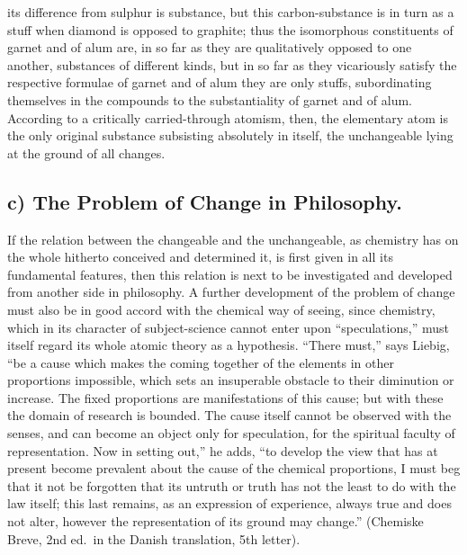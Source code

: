 \documentclass[12pt,a4paper]{book}
\begin{document}
its difference from
sulphur is substance, but this carbon-substance is in turn as a stuff when
diamond is opposed to graphite; thus the isomorphous constituents of garnet and
of alum are, in so far as they are qualitatively opposed to one another,
substances of different kinds, but in so far as they vicariously satisfy the
respective formulae of garnet and of alum they are only stuffs, subordinating
themselves in the compounds to the substantiality of garnet and of alum.
According to a critically carried-through atomism, then, the elementary atom is
the only original substance subsisting absolutely in itself, the unchangeable
lying at the ground of all changes.

\subsection*{c) The Problem of Change in Philosophy.}

If the relation between the changeable and the unchangeable, as chemistry has
on the whole hitherto conceived and determined it, is first given in all its
fundamental features, then this relation is next to be investigated and
developed from another side in philosophy. A further development of the problem
of change must also be in good accord with the chemical way of seeing, since
chemistry, which in its character of subject-science cannot enter upon
``speculations,'' must itself regard its whole atomic theory as a hypothesis.
``There must,'' says Liebig, ``be a cause which makes the coming together of
the elements in other proportions impossible, which sets an insuperable
obstacle to their diminution or increase. The fixed proportions are
manifestations of this cause; but with these the domain of research is bounded.
The cause itself cannot be observed with the senses, and can become an object
only for speculation, for the spiritual faculty of representation. Now in
setting out,'' he adds, ``to develop the view that has at present become
prevalent about the cause of the chemical proportions, I must beg that it not
be forgotten that its untruth or truth has not the least to do with the law
itself; this last remains, as an expression of experience, always true and does
not alter, however the representation of its ground may change.'' (Chemiske
Breve, 2nd ed.\ in the Danish translation, 5th letter).
\end{document}
